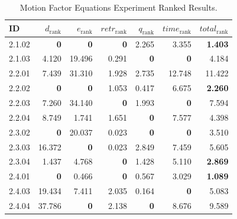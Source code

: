 \begin{table}[ht]
\centering
\footnotesize
\caption{Motion Factor Equations Experiment Ranked Results.}
\label{tab:motion_equations_ranked}
\begin{tabular}{@{}lrrrrrr@{}}
\hline
    ID & $d_{\text{rank}}$ & $e_{\text{rank}}$ & $retr_{\text{rank}}$ & $q_{\text{rank}}$ & $time_{\text{rank}}$ & $total_{\text{rank}}$ \\
\hline
    2.1.02 & \textbf{0} & \textbf{0} & \textbf{0} & 2.265 & 3.355 & \textbf{1.403} \\
    2.1.03 & 4.120 & 19.496 & 0.291 & \textbf{0} & \textbf{0} & 4.184 \\
    \noalign{\smallskip}
    2.2.01 & 7.439 & 31.310 & 1.928 & 2.735 & 12.748 & 11.422 \\
    2.2.02 & \textbf{0} & \textbf{0} & 1.053 & 0.417 & 6.675 & \textbf{2.260} \\
    2.2.03 & 7.260 & 34.140 & \textbf{0} & 1.993 & \textbf{0} & 7.594 \\
    2.2.04 & 8.749 & 1.741 & 1.651 & \textbf{0} & 7.577 & 4.398 \\
    \noalign{\smallskip}
    2.3.02 & \textbf{0} & 20.037 & 0.023 & \textbf{0} & \textbf{0} & 3.510 \\
    2.3.03 & 16.372 & \textbf{0} & 0.023 & 2.849 & 7.459 & 5.605 \\
    2.3.04 & 1.437 & 4.768 & \textbf{0} & 1.428 & 5.110 & \textbf{2.869} \\
    \noalign{\smallskip}
    2.4.01 & \textbf{0} & 0.466 & \textbf{0} & 0.567 & 3.029 & \textbf{1.089} \\
    2.4.03 & 19.434 & 7.411 & 2.035 & 0.164 & \textbf{0} & 5.083 \\
    2.4.04 & 37.786 & \textbf{0} & 2.138 & \textbf{0} & 8.676 & 9.589 \\
\hline
\end{tabular}
\end{table}